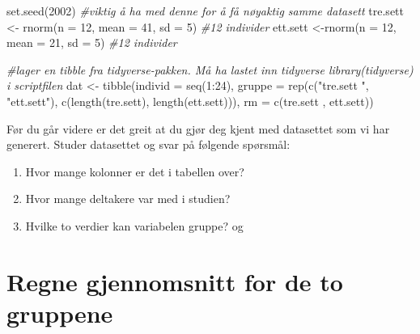 \documentclass[
]{book}
\newenvironment{Shaded}{\begin{snugshade}}{\end{snugshade}}
\newcommand{\AttributeTok}[1]{\textcolor[rgb]{0.77,0.63,0.00}{#1}}
\newcommand{\CommentTok}[1]{\textcolor[rgb]{0.56,0.35,0.01}{\textit{#1}}}
\newcommand{\DecValTok}[1]{\textcolor[rgb]{0.00,0.00,0.81}{#1}}
\newcommand{\FunctionTok}[1]{\textcolor[rgb]{0.00,0.00,0.00}{#1}}
\newcommand{\NormalTok}[1]{#1}
\newcommand{\OtherTok}[1]{\textcolor[rgb]{0.56,0.35,0.01}{#1}}
\newcommand{\SpecialCharTok}[1]{\textcolor[rgb]{0.00,0.00,0.00}{#1}}
\newcommand{\StringTok}[1]{\textcolor[rgb]{0.31,0.60,0.02}{#1}}
\providecommand{\tightlist}{%
  \setlength{\itemsep}{0pt}\setlength{\parskip}{0pt}}
\begin{document}
\begin{Shaded}
\begin{Highlighting}[]
\FunctionTok{set.seed}\NormalTok{(}\DecValTok{2002}\NormalTok{) }\CommentTok{\#viktig å ha med denne for å få nøyaktig samme datasett}
\NormalTok{tre.sett }\OtherTok{\textless{}{-}} \FunctionTok{rnorm}\NormalTok{(}\AttributeTok{n =} \DecValTok{12}\NormalTok{, }\AttributeTok{mean =} \DecValTok{41}\NormalTok{, }\AttributeTok{sd =} \DecValTok{5}\NormalTok{) }\CommentTok{\#12 individer}
\NormalTok{ett.sett }\OtherTok{\textless{}{-}}\FunctionTok{rnorm}\NormalTok{(}\AttributeTok{n =} \DecValTok{12}\NormalTok{, }\AttributeTok{mean =} \DecValTok{21}\NormalTok{, }\AttributeTok{sd =} \DecValTok{5}\NormalTok{) }\CommentTok{\#12 individer}

\CommentTok{\#lager en tibble fra tidyverse{-}pakken. Må ha lastet inn tidyverse library(tidyverse) i scriptfilen}
\NormalTok{dat }\OtherTok{\textless{}{-}} \FunctionTok{tibble}\NormalTok{(}\AttributeTok{individ =} \FunctionTok{seq}\NormalTok{(}\DecValTok{1}\SpecialCharTok{:}\DecValTok{24}\NormalTok{),}
              \AttributeTok{gruppe =} \FunctionTok{rep}\NormalTok{(}\FunctionTok{c}\NormalTok{(}\StringTok{"tre.sett "}\NormalTok{, }\StringTok{"ett.sett"}\NormalTok{), }\FunctionTok{c}\NormalTok{(}\FunctionTok{length}\NormalTok{(tre.sett), }\FunctionTok{length}\NormalTok{(ett.sett))),}
              \AttributeTok{rm =} \FunctionTok{c}\NormalTok{(tre.sett , ett.sett))}
\end{Highlighting}
\end{Shaded}

Før du går videre er det greit at du gjør deg kjent med datasettet som vi har generert. Studer datasettet og svar på følgende spørsmål:

\begin{enumerate}
\def\labelenumi{\arabic{enumi}.}
\tightlist
\item
  Hvor mange kolonner er det i tabellen over?
\item
  Hvor mange deltakere var med i studien?
\item
  Hvilke to verdier kan variabelen gruppe? og
\end{enumerate}

\hypertarget{regne-gjennomsnitt-for-de-to-gruppene}{%
\section{Regne gjennomsnitt for de to gruppene}\label{regne-gjennomsnitt-for-de-to-gruppene}}
\end{document}
